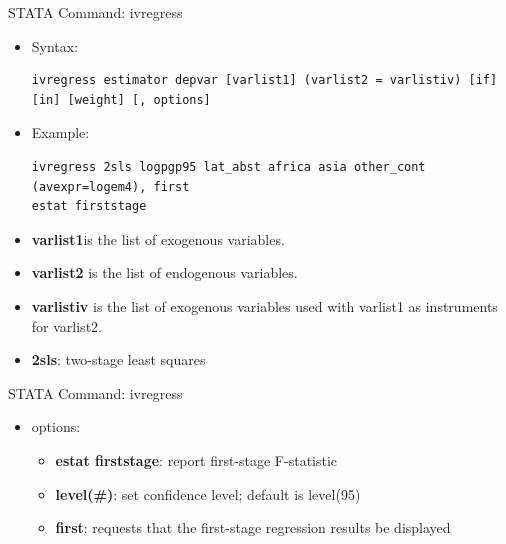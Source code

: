 \documentclass[dvipsnames,hyperref={pdfpagelabels=false}]{beamer}
\begin{document}
\begin{frame}[fragile]{STATA Command: ivregress}
	\begin{itemize}
\item Syntax:
\begin{lstlisting}
ivregress estimator depvar [varlist1] (varlist2 = varlistiv) [if] [in] [weight] [, options]
\end{lstlisting}
		
\item Example:
\begin{lstlisting}
ivregress 2sls logpgp95 lat_abst africa asia other_cont (avexpr=logem4), first
estat firststage
\end{lstlisting}
		
		\vspace{0.2cm}
		\item  \textbf{varlist1}is the list of exogenous variables.
		\vspace{0.2cm}
		\item \textbf{varlist2} is the list of endogenous variables.
		\vspace{0.2cm}
		\item \textbf{varlistiv} is the list of exogenous variables used with varlist1 as instruments for varlist2.
		\vspace{0.2cm}
		\item \textbf{2sls}: two-stage least squares
	\end{itemize}
\end{frame}



\begin{frame}[fragile]{STATA Command: ivregress}
	\begin{itemize}
		\item options:
		\begin{itemize}
			\vspace{0.2cm}
			\item \textbf{estat firststage}: report first-stage F-statistic
			\vspace{0.2cm}
			\item  \textbf{level(\#)}: set confidence level; default is level(95)
			\vspace{0.2cm}
			\item \textbf{first}: requests that the first-stage regression results be displayed
			
		\end{itemize}
	\end{itemize}
\end{frame}
\end{document}
